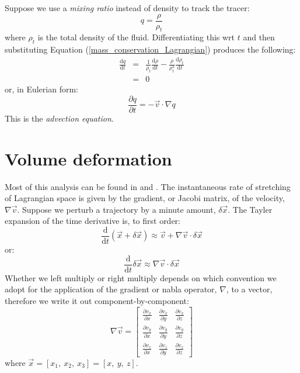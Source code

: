 \documentclass[11pt]{article}
\begin{document}
Suppose we use a {\it mixing ratio} instead of density to track the
tracer:
\begin{equation}
q = \frac {\rho}{\rho_t}
\end{equation}
where $\rho_t$ is the total density of the fluid.  Differentiating this wrt
$t$ and then substituting Equation (\ref{mass_conservation_Lagrangian})
produces the following:
\begin{eqnarray}
\frac{\mathrm d q}{\mathrm d t} & = & \frac{1}{\rho_t} \frac{\mathrm d \rho}{\mathrm d t}
	- \frac{\rho}{\rho_t^2}\frac{\mathrm d \rho_t}{\mathrm d t}\\
& = & 0
\end{eqnarray}
or, in Eulerian form:
\begin{equation}
\frac{\partial q}{\partial t} = - \vec v \cdot \nabla q
\label{advection_eqn}
\end{equation}
This is the {\it advection equation}.

\section{Volume deformation}

\label{deformation_section}

Most of this analysis can be found in \citet{Pattanayak2001} and 
\citet{Mills2004}. 
The instantaneous rate of stretching of Lagrangian space is given by the
gradient, or Jacobi matrix, of the velocity, $\nabla \vec v$.
Suppose we perturb a trajectory by a minute amount, $\delta \vec x$.
The Tayler expansion of the time derivative is, to first order:
\begin{equation}
\frac{\mathrm d}{\mathrm d t} (\vec x + \delta \vec x) \approx
	\vec v + \nabla \vec v \cdot \delta \vec x
\end{equation}
or:
\begin{equation}
\frac{\mathrm d}{\mathrm d t}\delta \vec x \approx \nabla \vec v \cdot \delta \vec x
\label{evolution_error_vector}
\end{equation}
Whether we left multiply or right multiply depends on which convention we adopt
for the application of the gradient or nabla operator, $\nabla$, to a vector,
therefore we write it out component-by-component:
\begin{equation}
\nabla \vec v = \left [
\begin{array}{ccc}
\frac{\partial v_x}{\partial x} & \frac{\partial v_x}{\partial y} & \frac{\partial v_x}{\partial z} \\
\frac{\partial v_y}{\partial x} & \frac{\partial v_y}{\partial y} & \frac{\partial v_y}{\partial z} \\
\frac{\partial v_z}{\partial x} & \frac{\partial v_z}{\partial y} & \frac{\partial v_z}{\partial z}
\end{array} \right ]
\end{equation}
where $\vec x=[x_1,~x_2,~x_3]=[x,~y,~z]$.
\end{document}
